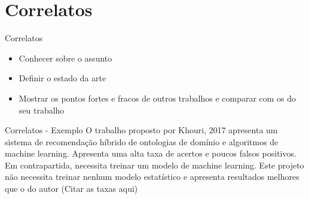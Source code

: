 \section{Correlatos}

\begin{frame}	
	\begin{block}{Correlatos}
		 \begin{itemize}
			  \item Conhecer sobre o assunto			  
			  \item Definir o estado da arte
			  \item Mostrar os pontos fortes e fracos de outros trabalhos e comparar com os do seu trabalho 
		  \end{itemize}
	\end{block}
\end{frame}

\begin{frame}	
	\begin{block}{Correlatos - Exemplo}
		O trabalho proposto por Khouri, 2017 apresenta um sistema de recomendação híbrido de ontologias de domínio e algoritmos de machine learning. Apresenta uma alta taxa de acertos e poucos falsos positivos. Em contrapartida, necessita treinar um modelo de machine learning. Este projeto não necessita treinar nenhum modelo estatístico e apresenta resultados melhores que o do autor (Citar as taxas aqui)
	\end{block}
\end{frame}